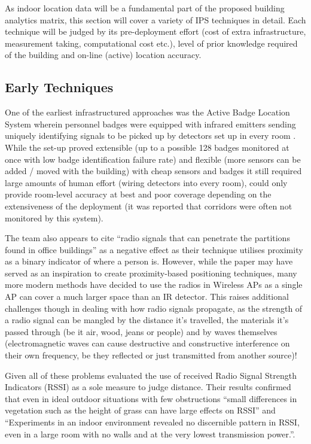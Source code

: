 \documentclass{UoYCSproject}
\begin{document}
            As indoor location data will be a fundamental part of the proposed building analytics matrix, this section will cover a variety of IPS techniques in detail. Each technique will be judged by its pre-deployment effort (cost of extra infrastructure, measurement taking, computational cost etc.), level of prior knowledge required of the building and on-line (active) location accuracy.
            
            \subsection{Early Techniques}
            \label{sec:early}
            
                One of the earliest infrastructured approaches was the Active Badge Location System wherein personnel badges were equipped with infrared emitters sending uniquely identifying signals to be picked up by detectors set up in every room \citep{want1992active}. While the set-up proved extensible (up to a possible 128 badges monitored at once with low badge identification failure rate) and flexible (more sensors can be added / moved with the building) with cheap sensors and badges it still required large amounts of human effort (wiring detectors into every room), could only provide room-level accuracy at best and poor coverage depending on the extensiveness of the deployment (it was reported that corridors were often not monitored by this system). 
            
                The team also appears to cite ``radio signals that can penetrate the partitions found in office buildings'' as a negative effect as their technique utilises proximity as a binary indicator of where a person is. However, while the paper may have served as an inspiration to create proximity-based positioning techniques, many more modern methods have decided to use the radios in Wireless APs as a single AP can cover a much larger space than an IR detector. This raises additional challenges though in dealing with how radio signals propagate, as the strength of a radio signal can be mangled by the distance it's travelled,  the materials it's passed through (be it air, wood, jeans or people) and by waves themselves (electromagnetic waves can cause destructive and constructive interference on their own frequency, be they reflected or just transmitted from another source)!
                
                Given all of these problems \citet{whitehouse2007practical} evaluated the use of received Radio Signal Strength Indicators (RSSI) as a sole measure to judge distance. Their results confirmed that even in ideal outdoor situations with few obstructions ``small differences in vegetation such as the height of grass can have large effects on RSSI'' and ``Experiments in an indoor environment revealed no discernible pattern in RSSI, even in a large room with no walls and at the very lowest transmission power.''.
            
\end{document}
